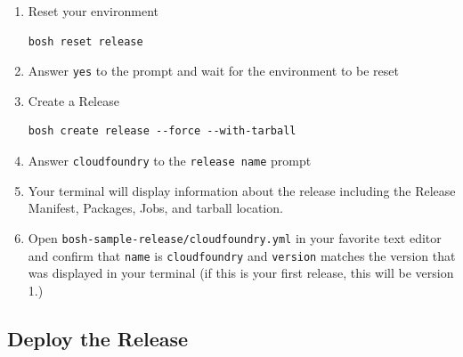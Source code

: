 \begin{enumerate}
\item Reset your environment

\begin{verbatim}
bosh reset release
\end{verbatim}


\item Answer \texttt{yes} to the prompt and wait for the environment to be reset

\item Create a Release

\begin{verbatim}
bosh create release --force --with-tarball
\end{verbatim}


\item Answer \texttt{cloudfoundry} to the \texttt{release name} prompt

\item Your terminal will display information about the release including the Release Manifest, Packages, Jobs, and tarball location.

\item Open \texttt{bosh-sample-release\slash cloudfoundry.yml} in your favorite text editor and confirm that \texttt{name} is \texttt{cloudfoundry} and \texttt{version} matches the version that was displayed in your terminal (if this is your first release, this will be version 1.)

\end{enumerate}

\subsection{Deploy the Release}
\label{deploytherelease}

